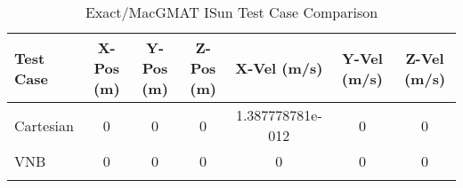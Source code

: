 \begin{table}[htbp!]
\centering
\caption{ Exact/MacGMAT ISun Test Case Comparison}
      \begin{tabular}{lcccccc}
      \hline\hline
          Test Case & X-Pos (m) & Y-Pos (m) & Z-Pos (m) & X-Vel (m/s) & Y-Vel (m/s) & Z-Vel (m/s) \\
         \hline
         Cartesian & 0 & 0 & 0 & 1.387778781e-012 & 0 & 0 \\
         VNB & 0 & 0 & 0 & 0 & 0 & 0 \\
      \hline\hline
      \label{Table: ISun Exact-MacGMAT Table} 
\end{tabular}
\end{table}
